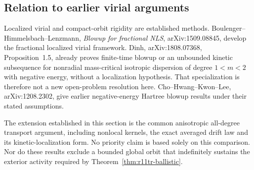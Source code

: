 \subsection{Relation to earlier virial arguments}
Localized virial and compact-orbit rigidity are established methods.
Boulenger--Himmelsbach--Lenzmann, \emph{Blowup for fractional NLS},
arXiv:1509.08845, develop the fractional localized virial framework.
Dinh, arXiv:1808.07368, Proposition~1.5, already proves finite-time
blowup or an unbounded kinetic subsequence for nonradial mass-critical
isotropic dispersion of degree $1<m<2$ with negative energy, without
a localization hypothesis. That specialization is therefore not a
new open-problem resolution here. Cho--Hwang--Kwon--Lee,
arXiv:1208.2302, give earlier negative-energy Hartree blowup results
under their stated assumptions.

The extension established in this section is the common anisotropic
all-degree transport argument, including nonlocal kernels, the exact
averaged drift law and its kinetic-localization form. No priority claim
is based solely on this comparison. Nor do these results exclude a
bounded global orbit that indefinitely sustains the exterior activity
required by Theorem~\ref{thm:r11tr-ballistic}.

